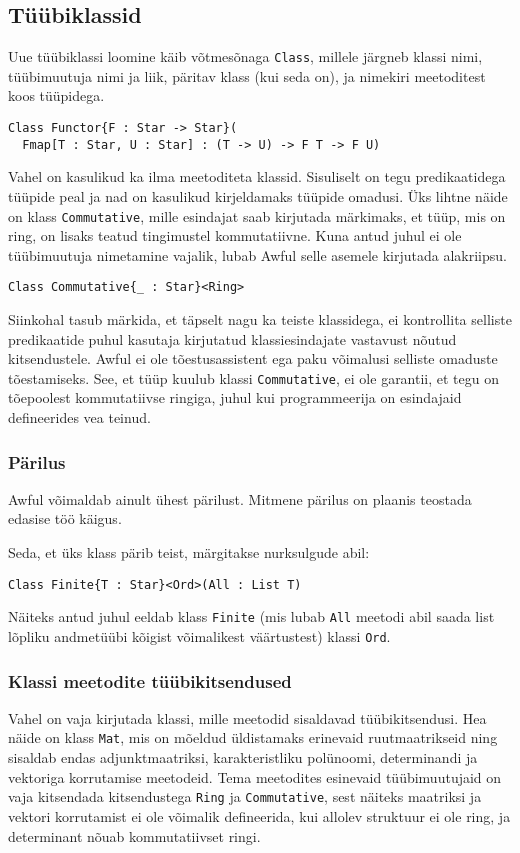 \documentclass[12pt]{article}
\begin{document}
    \subsection{Tüübiklassid}
      Uue tüübiklassi loomine käib võtmesõnaga \verb!Class!, millele järgneb klassi nimi, tüübimuutuja nimi ja liik, päritav klass (kui seda on), ja nimekiri meetoditest koos tüüpidega.

      \begin{verbatim}Class Functor{F : Star -> Star}(
  Fmap[T : Star, U : Star] : (T -> U) -> F T -> F U)\end{verbatim}

      Vahel on kasulikud ka ilma meetoditeta klassid. Sisuliselt on tegu predikaatidega tüüpide peal ja nad on kasulikud kirjeldamaks tüüpide omadusi. Üks lihtne näide on klass \verb!Commutative!, mille esindajat saab kirjutada märkimaks, et tüüp, mis on ring, on lisaks teatud tingimustel kommutatiivne. Kuna antud juhul ei ole tüübimuutuja nimetamine vajalik, lubab Awful selle asemele kirjutada alakriipsu.

      \begin{verbatim}Class Commutative{_ : Star}<Ring>\end{verbatim}

      Siinkohal tasub märkida, et täpselt nagu ka teiste klassidega, ei kontrollita selliste predikaatide puhul kasutaja kirjutatud klassiesindajate vastavust nõutud kitsendustele. Awful ei ole tõestusassistent ega paku võimalusi selliste omaduste tõestamiseks. See, et tüüp kuulub klassi \verb!Commutative!, ei ole garantii, et tegu on tõepoolest kommutatiivse ringiga, juhul kui programmeerija on esindajaid defineerides vea teinud.
      \subsubsection{Pärilus}
        Awful võimaldab ainult ühest pärilust. Mitmene pärilus on plaanis teostada edasise töö käigus.

        Seda, et üks klass pärib teist, märgitakse nurksulgude abil:

        \begin{verbatim}Class Finite{T : Star}<Ord>(All : List T)\end{verbatim}

        Näiteks antud juhul eeldab klass \verb!Finite! (mis lubab \verb!All! meetodi abil saada list lõpliku andmetüübi kõigist võimalikest väärtustest) klassi \verb!Ord!.
      \subsubsection{Klassi meetodite tüübikitsendused}
        Vahel on vaja kirjutada klassi, mille meetodid sisaldavad tüübikitsendusi. Hea näide on klass \verb!Mat!, mis on mõeldud üldistamaks erinevaid ruutmaatrikseid ning sisaldab endas adjunktmaatriksi, karakteristliku polünoomi, determinandi ja vektoriga korrutamise meetodeid. Tema meetodites esinevaid tüübimuutujaid on vaja kitsendada kitsendustega \verb!Ring! ja \verb!Commutative!, sest näiteks maatriksi ja vektori korrutamist ei ole võimalik defineerida, kui allolev struktuur ei ole ring, ja determinant nõuab kommutatiivset ringi.
\end{document}
